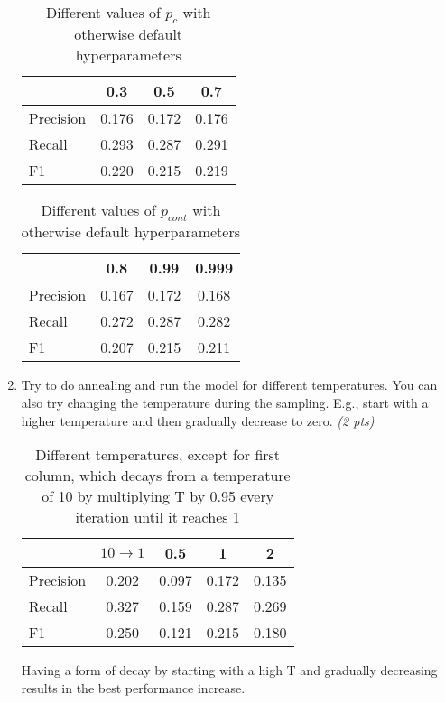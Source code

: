 \documentclass[a4paper]{article}
\begin{document}
\begin{enumerate}
		\begin{table}[H]
			\centering
			\caption{Different values of $p_c$ with otherwise default
			hyperparameters}
			\label{tab:p_c}
			\begin{tabular}{l|c|c|c}
				& 0.3 & 0.5 & 0.7 \\
				\hline
				Precision & 0.176 & 0.172 & 0.176 \\
				Recall & 0.293 & 0.287 & 0.291 \\
				F1 & 0.220 & 0.215 & 0.219 \\
			\end{tabular}
		\end{table}

		\begin{table}[H]
			\centering
			\caption{Different values of $p_{cont}$ with otherwise default
			hyperparameters}
			\label{tab:p_cont}
			\begin{tabular}{l|c|c|c}
				& 0.8 & 0.99 & 0.999 \\
				\hline
				Precision & 0.167 & 0.172 & 0.168 \\
				Recall & 0.272 & 0.287 & 0.282 \\
				F1 & 0.207 & 0.215 & 0.211 \\
			\end{tabular}
		\end{table}

	\item Try to do annealing and run the model for different temperatures. You
		can also try changing the temperature during the sampling. E.g., start
		with a higher temperature and then gradually decrease to zero.
		\textit{(2 pts)}

		\begin{table}[H]
			\centering
			\caption{Different temperatures, except for first column, which
            decays from a temperature of 10 by multiplying T by 0.95 every
        iteration until it reaches 1}
			\label{tab:anneal}
			\begin{tabular}{l|c|c|c|c}
			& $10 \to 1$ & 0.5 & 1 & 2 \\
			\hline
                Precision & 0.202 & 0.097 & 0.172 & 0.135 \\
                Recall & 0.327 & 0.159 & 0.287 & 0.269 \\
                F1 & 0.250 & 0.121 & 0.215 & 0.180
			\end{tabular}
		\end{table}

        Having a form of decay by starting with a high T and gradually decreasing
        results in the best performance increase.


\end{enumerate}
\end{document}
